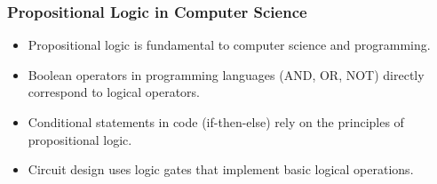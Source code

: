 \documentclass{beamer}
\begin{document}
                                    \begin{frame}
                                    \frametitle{Propositional Logic in Computer Science}
                                    \begin{itemize}
                                        \item Propositional logic is fundamental to computer science and programming.
                                        \item Boolean operators in programming languages (AND, OR, NOT) directly correspond to logical operators.
                                        \item Conditional statements in code (if-then-else) rely on the principles of propositional logic.
                                        \item Circuit design uses logic gates that implement basic logical operations.
                                    \end{itemize}
                                    

\end{frame}
\end{document}
